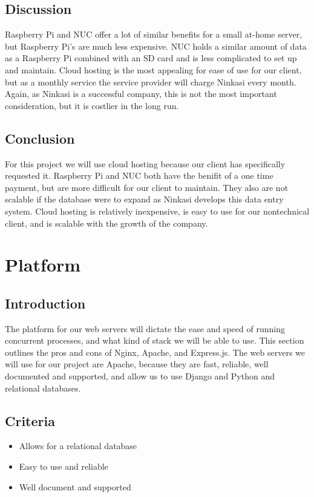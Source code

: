 \documentclass[draftclsnofoot,onecolumn,letterpaper,10pt,compsoc]{IEEEtran}
\begin{document}
					\subsection{Discussion}
						Raspberry Pi and NUC offer a lot of similar benefits for a small at-home server, but Raspberry Pi’s are much less expensive.
						NUC holds a similar amount of data as a Raspberry Pi combined with an SD card and is less complicated to set up and maintain.
						Cloud hosting is the most appealing for ease of use for our client, but as a monthly service the service provider will charge Ninkasi every month.
						Again, as Ninkasi is a successful company, this is not the most important consideration, but it is costlier in the long run.

						\subsection{Conclusion}
						For this project we will use cloud hosting because our client has specifically requested it.
            Raspberry Pi and NUC both have the benifit of a one time payment, but are more difficult for our client to maintain.
            They also are not scalable if the database were to expand as Ninkasi develops this data entry system.
						Cloud hosting is relatively inexpensive, is easy to use for our nontechnical client, and is scalable with the growth of the company.

		\section{Platform}
		\subsection{Introduction}
		The platform for our web servers will dictate the ease and speed of running concurrent processes, and what kind of stack we will be able to use.
		This section outlines the pros and cons of Nginx, Apache, and Express.js.
		The web servers we will use for our project are Apache, because they are fast, reliable, well documented and supported, and allow us to use Django and Python and relational databases.
		\subsection{Criteria}
		\begin{itemize}
		\item Allows for a relational database
		\item Easy to use and reliable
		\item Well document and supported
		\end{itemize}
\end{document}
